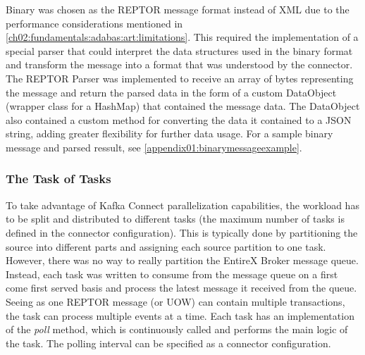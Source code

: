 Binary was chosen as the \ac{REPTOR} message format instead of XML due to the performance considerations mentioned in \ref{ch02:fundamentals:adabas:art:limitations}. This required the implementation of a special parser that could interpret the data structures used in the binary format and transform the message into a format that was understood by the connector. The \ac{REPTOR} Parser was implemented to receive an array of bytes representing the message and return the parsed data in the form of a custom DataObject (wrapper class for a HashMap) that contained the message data. The DataObject also contained a custom method for converting the data it contained to a JSON string, adding greater flexibility for further data usage. For a sample binary message and parsed ressult, see \ref{appendix01:binarymessageexample}.




\subsubsection{The Task of Tasks}
To take advantage of Kafka Connect parallelization capabilities, the workload has to be split and distributed to different tasks (the maximum number of tasks is defined in the connector configuration). This is typically done by partitioning the source into different parts and assigning each source partition to one task. However, there was no way to really partition the EntireX Broker message queue. Instead, each task was written to consume from the message queue on a first come first served basis and process the latest message it received from the queue. Seeing as one \ac{REPTOR} message (or \ac{UOW}) can contain multiple transactions, the task can process multiple events at a time. Each task has an implementation of the \textit{poll} method, which is continuously called and performs the main logic of the task. The polling interval can be specified as a connector configuration.

